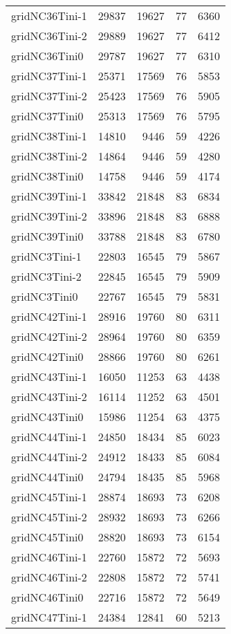 \begin{tabular}{lrrrr}
gridNC36Tini-1 & 29837 & 19627 & 77 & 6360 \\
gridNC36Tini-2 & 29889 & 19627 & 77 & 6412 \\
gridNC36Tini0 & 29787 & 19627 & 77 & 6310 \\
gridNC37Tini-1 & 25371 & 17569 & 76 & 5853 \\
gridNC37Tini-2 & 25423 & 17569 & 76 & 5905 \\
gridNC37Tini0 & 25313 & 17569 & 76 & 5795 \\
gridNC38Tini-1 & 14810 & 9446 & 59 & 4226 \\
gridNC38Tini-2 & 14864 & 9446 & 59 & 4280 \\
gridNC38Tini0 & 14758 & 9446 & 59 & 4174 \\
gridNC39Tini-1 & 33842 & 21848 & 83 & 6834 \\
gridNC39Tini-2 & 33896 & 21848 & 83 & 6888 \\
gridNC39Tini0 & 33788 & 21848 & 83 & 6780 \\
gridNC3Tini-1 & 22803 & 16545 & 79 & 5867 \\
gridNC3Tini-2 & 22845 & 16545 & 79 & 5909 \\
gridNC3Tini0 & 22767 & 16545 & 79 & 5831 \\
gridNC42Tini-1 & 28916 & 19760 & 80 & 6311 \\
gridNC42Tini-2 & 28964 & 19760 & 80 & 6359 \\
gridNC42Tini0 & 28866 & 19760 & 80 & 6261 \\
gridNC43Tini-1 & 16050 & 11253 & 63 & 4438 \\
gridNC43Tini-2 & 16114 & 11252 & 63 & 4501 \\
gridNC43Tini0 & 15986 & 11254 & 63 & 4375 \\
gridNC44Tini-1 & 24850 & 18434 & 85 & 6023 \\
gridNC44Tini-2 & 24912 & 18433 & 85 & 6084 \\
gridNC44Tini0 & 24794 & 18435 & 85 & 5968 \\
gridNC45Tini-1 & 28874 & 18693 & 73 & 6208 \\
gridNC45Tini-2 & 28932 & 18693 & 73 & 6266 \\
gridNC45Tini0 & 28820 & 18693 & 73 & 6154 \\
gridNC46Tini-1 & 22760 & 15872 & 72 & 5693 \\
gridNC46Tini-2 & 22808 & 15872 & 72 & 5741 \\
gridNC46Tini0 & 22716 & 15872 & 72 & 5649 \\
gridNC47Tini-1 & 24384 & 12841 & 60 & 5213 \\

\end{tabular}
